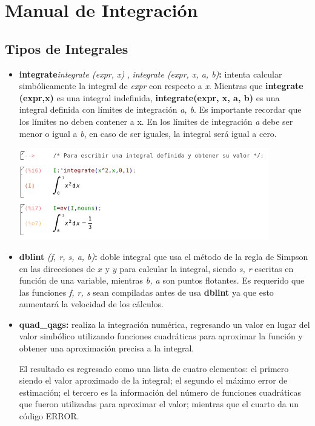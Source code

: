 \documentclass{article}
\begin{document}
\section{Manual de Integración}

\subsection{Tipos de Integrales}

\begin{itemize}
\item\textbf{integrate}\textit{integrate (expr, x)} , \textit{integrate (expr, x, a, b)}\textbf{:} intenta calcular simbólicamente la integral de \textit{expr} con respecto a \textit{x}. Mientras que \textbf{integrate (expr,x)} es una integral indefinida, \textbf{integrate(expr, x, a, b)} es una integral definida con límites de integración \textit{a, b}. Es importante recordar que los límites no deben contener a x. En los límites de integración \textit{a} debe ser menor o igual a \textit{b}, en caso de ser iguales, la integral será igual a cero.


	\begin{center}
    \includegraphics[height=4cm]{intdefinida.png}
    \end{center}

\item \textbf{dblint} \textit{(f, r, s, a, b)}\textbf{:} doble integral que usa el método de la regla de Simpson en las direcciones de $x$ y $y$ para calcular la integral, siendo \textit{s, r} escritas en función de una variable, mientras \textit{b, a} son puntos flotantes. Es requerido que las funciones \textit{f, r, s} sean compiladas antes de usa \textbf{dblint} ya que esto aumentará la velocidad de los cálculos.


\item\textbf{quad\_qags:} realiza la integración numérica, regresando un valor en lugar del valor simbólico utilizando funciones cuadráticas para aproximar la función y obtener una aproximación precisa a la integral. 

El resultado es regresado como una lista de cuatro elementos: el primero siendo el valor aproximado de la integral; el segundo el máximo error de estimación; el tercero es la información del número de funciones cuadráticas que fueron utilizadas para aproximar el valor; mientras que el cuarto da un código ERROR.


\end{itemize}
\end{document}
